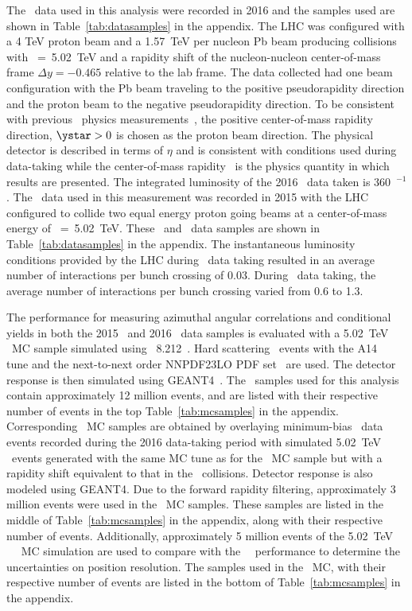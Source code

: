 
The \pPb\ data used in this analysis were recorded in 2016 and the samples used are shown in Table~\ref{tab:datasamples} in the appendix. The LHC was configured with a 4 TeV proton beam and a 1.57~TeV per nucleon Pb beam  producing collisions with \sqrtsnn~=~5.02~TeV and a rapidity shift of the  nucleon-nucleon center-of-mass frame $\Delta y=-0.465$ relative to the lab frame. The data collected had one beam configuration with the Pb beam traveling to the positive pseudorapidity direction and the proton beam to the negative pseudorapidity direction. To be consistent with previous \pPb\ physics measurements~\cite{ATLAS:2014cpa,Aaboud:2017tke}, the positive center-of-mass rapidity direction, $\ystar>0$ is chosen as the proton beam direction. The physical detector is described in terms of $\eta$ and is consistent with conditions used during data-taking while the center-of-mass rapidity \ystar\ is the physics quantity in which results are presented. The integrated luminosity of the 2016 \pPb\ data taken is 360~\mubarn$^{-1}$. The \pp\ data used in this measurement was recorded in 2015 with the LHC configured to collide two equal energy proton going beams at a center-of-mass energy of \sqrts~=~5.02~TeV. These \pp\ and \pPb\ data samples are shown in Table~\ref{tab:datasamples} in the appendix. The instantaneous luminosity conditions provided by the LHC during \pPb\ data taking resulted in an average number of interactions per bunch crossing of 0.03. During \pp\ data taking, the average number of interactions per bunch crossing varied from 0.6 to 1.3. 

The performance for measuring azimuthal angular correlations and conditional yields in both the 2015  \pp\ and 2016 \pPb\ data samples is evaluated with a 5.02~TeV \pp\ MC sample simulated using \pythia\ 8.212~\cite{Sjostrand:2014zea}. Hard scattering \pp\ events with the A14~\cite{ATLAS2014021} tune and the next-to-next order NNPDF23LO PDF set~\cite{Ball:2012cx} are used. The detector response is then simulated using GEANT4~\cite{Agostinelli:2002hh,Aad:2010ah}. The \pp\ samples used for this analysis contain approximately 12 million events, and are listed with their respective number of events in the top Table~\ref{tab:mcsamples} in the appendix. Corresponding \pPb\ MC samples are obtained by overlaying minimum-bias \pPb\ data events recorded during the 2016 data-taking period with simulated 5.02~TeV \pp\ events generated with the same MC tune as for the \pp\ MC sample but with a rapidity shift equivalent to that in the \pPb\ collisions. Detector response is also modeled using GEANT4. Due to the forward rapidity filtering, approximately 3 million events were used in the \pPb\ MC samples. These samples are listed in the middle of Table~\ref{tab:mcsamples} in the appendix, along with their respective number of events. Additionally, approximately 5 million events of the 5.02~TeV \pp\ \herwig~\cite{Bahr:2008pv} MC simulation are used to compare with the \pp\ \pythiaeight\ performance to determine the uncertainties on position resolution. The samples used in the \herwig\ MC, with their respective number of events are listed in the bottom of Table~\ref{tab:mcsamples} in the appendix.

